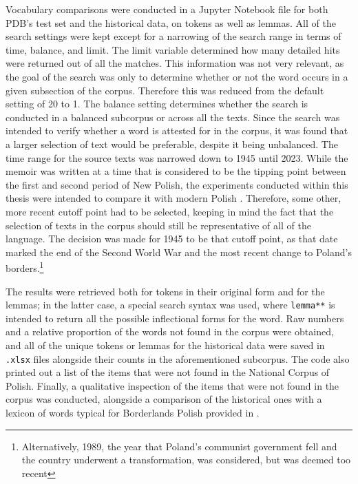 Vocabulary comparisons were conducted in a Jupyter Notebook file for both PDB's test set and the historical data, on tokens as well as lemmas. All of the search settings were kept except for a narrowing of the search range in terms of time, balance, and limit. The limit variable determined how many detailed hits were returned out of all the matches. This information was not very relevant, as the goal of the search was only to determine whether or not the word occurs in a given subsection of the corpus. Therefore this was reduced from the default setting of 20 to 1. The balance setting determines whether the search is conducted in a balanced subcorpus or across all the texts. Since the search was intended to verify whether a word is attested for in the corpus, it was found that a larger selection of text would be preferable, despite it being unbalanced. The time range for the source texts was narrowed down to 1945 until 2023. While the memoir was written at a time that is considered to be the tipping point between the first and second period of New Polish, the experiments conducted within this thesis were intended to compare it with modern Polish \citep{długosz-kurczabowa_dubisz_2006}. Therefore, some other, more recent cutoff point had to be selected, keeping in mind the fact that the selection of texts in the corpus should still be representative of all of the language. The decision was made for 1945 to be that cutoff point, as that date marked the end of the Second World War and the most recent change to Poland's borders.\footnote{Alternatively, 1989, the year that Poland's communist government fell and the country underwent a transformation, was considered, but was deemed too recent}

The results were retrieved both for tokens in their original form and for the lemmas; in the latter case, a special search syntax was used, where \texttt{lemma**} is intended to return all the possible inflectional forms for the word. Raw numbers and a relative proportion of the words not found in the corpus were obtained, and all of the unique tokens or lemmas for the historical data were saved in \texttt{.xlsx} files alongside their counts in the aforementioned subcorpus. The code also printed out a list of the items that were not found in the National Corpus of Polish. Finally, a qualitative inspection of the items that were not found in the corpus was conducted, alongside a comparison of the historical ones with a lexicon of words typical for Borderlands Polish provided in \citet{kurzowa_1983}. 

